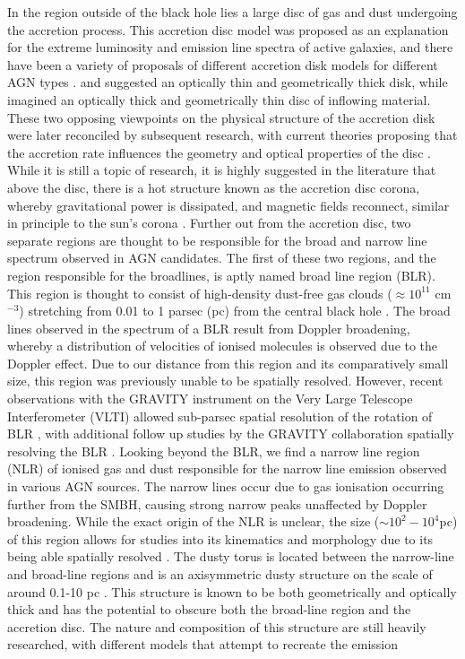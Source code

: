 In the region outside of the black hole lies a large disc of gas and dust undergoing the accretion process. This accretion disc model was proposed as an explanation for the extreme luminosity and emission line spectra of active galaxies, and there have been a variety of proposals of different accretion disk models for different AGN types \citep{netzer_revisiting_2015}. \cite{narayan_advection-dominated_1995} and \cite{esin_hot_1996} suggested an optically thin and geometrically thick disk, while \cite{shakura_black_1973} imagined an optically thick and geometrically thin disc of inflowing material. These two opposing viewpoints on the physical structure of the accretion disk were later reconciled by subsequent research, with current theories proposing that the accretion rate influences the geometry and optical properties of the disc \citep{abramowicz_foundations_2013}. While it is still a topic of research, it is highly suggested in the literature that above the disc, there is a hot structure known as the accretion disc corona, whereby gravitational power is dissipated, and magnetic fields reconnect, similar in principle to the sun's corona \citep{haardt_two-phase_1991}. Further out from the accretion disc, two separate regions are thought to be responsible for the broad and narrow line spectrum observed in AGN candidates. The first of these two regions, and the region responsible for the broadlines, is aptly named broad line region (BLR). This region is thought to consist of high-density dust-free gas clouds ($\approx 10^{11}$ cm$^{-3}$) stretching from 0.01 to 1 parsec (pc) from the central black hole \citep{baskin_dust_2018}. The broad lines observed in the spectrum of a BLR result from Doppler broadening, whereby a distribution of velocities of ionised molecules is observed due to the Doppler effect. Due to our distance from this region and its comparatively small size, this region was previously unable to be spatially resolved. However, recent observations with the GRAVITY instrument \citep{eisenhauer_gravity_2011} on the Very Large Telescope Interferometer (VLTI) allowed sub-parsec spatial resolution of the rotation of BLR \citep{gravity_collaboration_spatially_2018}, with additional follow up studies by the GRAVITY collaboration spatially resolving the BLR  \citep{gravity_collaboration_spatially_2020}. Looking beyond the BLR, we find a narrow line region (NLR) of ionised gas and dust responsible for the narrow line emission observed in various AGN sources. The narrow lines occur due to gas ionisation occurring further from the SMBH, causing strong narrow peaks unaffected by Doppler broadening. While the exact origin of the NLR is unclear, the size ($\sim10^{2}-10^{4}$pc) of this region allows for studies into its kinematics and morphology due to its being able spatially resolved \citep{joh_gas_2021}. The dusty torus is located between the narrow-line and broad-line regions and is an axisymmetric dusty structure on the scale of around 0.1-10 pc \citep{netzer_revisiting_2015}. This structure is known to be both geometrically and optically thick and has the potential to obscure both the broad-line region and the accretion disc. The nature and composition of this structure are still heavily researched, with different models that attempt to recreate the emission 